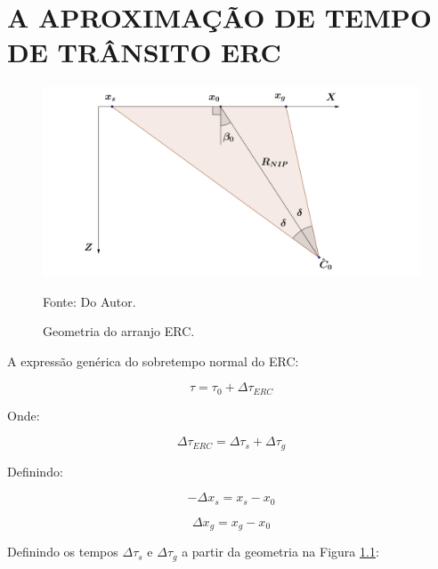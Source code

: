 \chapter{A APROXIMAÇÃO DE TEMPO DE TRÂNSITO ERC}
\label{ap:tempo_cre}

\begin{figure}[H]
\caption{Geometria do arranjo ERC.}
\begin{center}
\includegraphics[scale=0.5]{images/creGeom.png}
\vspace{-0.3cm}
\end{center}
\begin{center}
 Fonte: Do Autor.
\end{center}
\label{fig:ap:1.1}
\end{figure}

A expressão genérica do sobretempo normal do ERC:

\begin{equation}
\label{eq:ap:1.1}
\tau = \tau_0 + \Delta \tau_{ERC}
\end{equation}

Onde:

\begin{equation}
\label{eq:ap:1.2}
\Delta \tau_{ERC} = \Delta \tau_s + \Delta \tau_g
\end{equation}

Definindo:

\begin{equation}
\label{eq:ap:1.3}
-\Delta x_s = x_s - x_0
\end{equation}

\begin{equation}
\label{eq:ap:1.4}
\Delta x_g = x_g - x_0
\end{equation}

Definindo os tempos $\Delta \tau_s$ e $\Delta \tau_g$ a partir da geometria na Figura \ref{fig:ap:1.1}:

